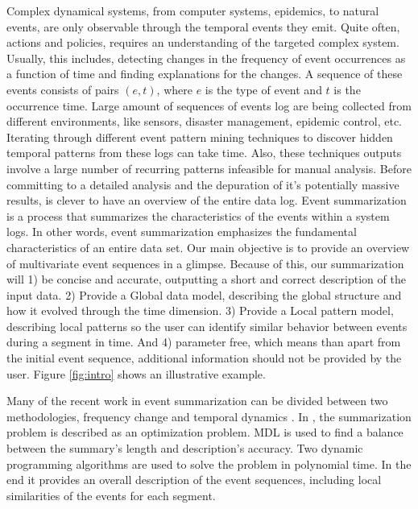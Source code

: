 Complex dynamical systems, from computer systems, epidemics, to natural events, are only observable through the temporal events they emit.  Quite often, actions and policies, requires an understanding of the targeted complex system. Usually, this includes, detecting changes in the frequency of event occurrences as a function of time and finding explanations for the changes.  A sequence of these events consists  of pairs $(e,t)$, where $e$ is the type of event and $t$ is the occurrence time. Large amount of sequences of events log are being collected from different environments, like sensors, disaster management, epidemic control, etc. Iterating through different event pattern mining techniques to discover hidden temporal patterns from these logs can take time. Also, these techniques outputs involve a large number of recurring patterns infeasible for manual analysis. Before committing to a detailed analysis and the depuration of it's potentially massive results, is clever to have an overview of the entire data log. Event summarization is a process that summarizes the characteristics of the events within a system logs. In other words, event summarization emphasizes the fundamental characteristics of an entire data set. Our main objective is to provide an overview of multivariate event sequences in a glimpse. Because of this, our summarization will 1) be concise and accurate, outputting a short and correct description of the input data. 2) Provide a Global data model, describing the global structure and how it evolved through the time dimension. 3) Provide a Local pattern model, describing local patterns so the user can identify similar behavior between events during a segment in time. And 4) parameter free, which means than apart from the initial event sequence, additional information should not be provided by the user. Figure \ref{fig:intro} shows an illustrative example. 




Many of the recent work in event summarization can be divided between two methodologies, frequency change \cite{Kiernan:constructing,wang:algo} and temporal dynamics \cite{jiang:natural,Peng:2007,Schneider:2010,Tatti:2012}.
In \cite{Kiernan:constructing}, the summarization problem is described as an optimization problem. MDL is used to find a balance between the summary's length and description's accuracy. Two dynamic programming algorithms are used to solve the problem in polynomial time. In the end it provides an overall description of the event sequences, including local similarities of the events for each segment. 

